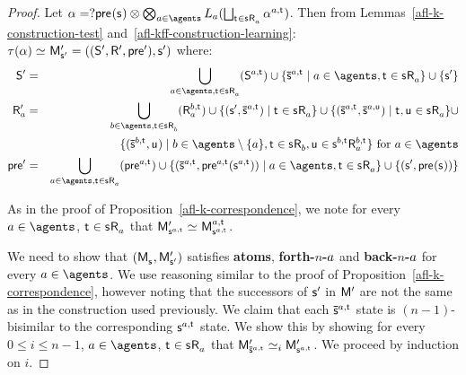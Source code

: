 \begin{proof}
Let $\alpha = \test{\aPrecondition(\aStateS)} \compose \bigcompose_{\agentA \in \agents} \learnsA (\bigchoice_{\aStateT \in \aStateS \aAccessibility{\agentA}} \alpha^{\agentA,\aStateT})$. 
Then from Lemmas~\ref{afl-k-construction-test} and~\ref{afl-kff-construction-learning}: $\tau(\alpha) \bisimilar \aPModelP{\aStateSP} = \aPModelTupleP{\aStateSP}$ where:
\begin{eqnarray*}
    \aStatesP &=& \bigcup_{\agentA \in \agents, \aStateT \in \aStateS \aAccessibility{\agentA}} (\aStates[\agentA,\aStateT]) \cup \{\aPStateS[\agentA,\aStateT] \mid \agentA \in \agents, \aStateT \in \aStateS \aAccessibility{\agentA}\} \cup \{\aStateSP\}\\
    \aAccessibilityP{\agentA} &=& \bigcup_{\agentB \in \agents, \aStateT \in \aStateS \aAccessibility{\agentB}} (\aAccessibility[\agentB,\aStateT]{\agentA}) \cup \{(\aStateSP, \aPStateS[\agentA, \aStateT]) \mid \aStateT \in \aStateS \aAccessibility{\agentA}\} \cup \{(\aPStateS[\agentA, \aStateT], \aPStateS[\agentA, \aStateU]) \mid \aStateT, \aStateU \in \aStateS \aAccessibility{\agentA}\} \cup\\
                                               &&\hspace{45pt}\{(\aPStateS[\agentB, \aStateT], \aStateU) \mid \agentB \in \agents \setminus \{\agentA\}, \aStateT \in \aStateS \aAccessibility{\agentB}, \aStateU \in \aStateS[\agentB,\aStateT] \aAccessibility[\agentB,\aStateT]{\agentA}\} \text{ for } \agentA \in \agents\\
    \aPreconditionP &=& \bigcup_{\agentA \in \agents, \aStateT \in \aStateS \aAccessibility{\agentA}} (\aPrecondition[\agentA,\aStateT]) \cup \{(\aPStateS[\agentA, \aStateT], \aPrecondition[\agentA,\aStateT](\aStateS[\agentA,\aStateT])) \mid \agentA \in \agents, \aStateT \in \aStateS \aAccessibility{\agentA}\} \cup \{(\aStateSP, \aPrecondition(\aStateS))\}
\end{eqnarray*}

As in the proof of Proposition~\ref{afl-k-correspondence}, we note for every $\agentA \in \agents$, $\aStateT \in \aStateS \aAccessibility{\agentA}$ that $\aPModelP{\aStateS[\agentA,\aStateT]} \bisimilar \aPModel[\agentA,\aStateT]{\aStateS[\agentA,\aStateT]}$.

We need to show that $(\aPModel{\aStateS}, \aPModelP{\aStateSP})$ satisfies {\bf atoms}, {\bf forth-$n$-$a$} and {\bf back-$n$-$a$} for every $\agentA \in \agents$.
We use reasoning similar to the proof of Proposition~\ref{afl-k-correspondence}, however noting that the successors of ${\mathsf{{s}}^{\prime}}$ in ${\mathsf{M}^{\prime}}$ are not the same as in the construction used previously.
We claim that each $\aPStateS[\agentA,\aStateT]$ state is $(n-1)$-bisimilar to the corresponding $\aStateS[\agentA,\aStateT]$ state.
We show this by showing for every $0 \leq i \leq n - 1$, $\agentA \in \agents$, $\aStateT \in \aStateS \aAccessibility{\agentA}$ that $\aPModelP{\aPStateS[\agentA,\aStateT]} \bisimilar[i] \aPModelP{\aStateS[\agentA,\aStateT]}$.
We proceed by induction on $i$.


\end{proof}
